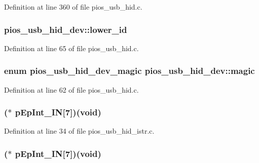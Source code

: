 Definition at line 360 of file pios\-\_\-usb\-\_\-hid.\-c.

\hypertarget{group___p_i_o_s___u_s_b___h_i_d_ga088a37cd66d7047583d47a16a3381e4f}{
\subsubsection[{lower\-\_\-id}]{ pios\-\_\-usb\-\_\-hid\-\_\-dev\-::lower\-\_\-id}}\label{group___p_i_o_s___u_s_b___h_i_d_ga088a37cd66d7047583d47a16a3381e4f}


Definition at line 65 of file pios\-\_\-usb\-\_\-hid.\-c.

\hypertarget{group___p_i_o_s___u_s_b___h_i_d_ga31a2e7a6eac13138808d37592a55be4e}{
\subsubsection[{magic}]{\setlength{\rightskip}{0pt plus 5cm}enum {\bf pios\-\_\-usb\-\_\-hid\-\_\-dev\-\_\-magic} pios\-\_\-usb\-\_\-hid\-\_\-dev\-::magic}}\label{group___p_i_o_s___u_s_b___h_i_d_ga31a2e7a6eac13138808d37592a55be4e}


Definition at line 62 of file pios\-\_\-usb\-\_\-hid.\-c.

\hypertarget{group___p_i_o_s___u_s_b___h_i_d_ga0992c19a0f2e317fcd93f755d316a0fd}{
\subsubsection[{p\-Ep\-Int\-\_\-\-I\-N}]{($\ast$ p\-Ep\-Int\-\_\-\-I\-N\mbox{[}7\mbox{]})({\bf void})}}\label{group___p_i_o_s___u_s_b___h_i_d_ga0992c19a0f2e317fcd93f755d316a0fd}


Definition at line 34 of file pios\-\_\-usb\-\_\-hid\-\_\-istr.\-c.

\hypertarget{group___p_i_o_s___u_s_b___h_i_d_ga0992c19a0f2e317fcd93f755d316a0fd}{
\subsubsection[{p\-Ep\-Int\-\_\-\-I\-N}]{($\ast$ p\-Ep\-Int\-\_\-\-I\-N\mbox{[}7\mbox{]})({\bf void})}}\label{group___p_i_o_s___u_s_b___h_i_d_ga0992c19a0f2e317fcd93f755d316a0fd}



